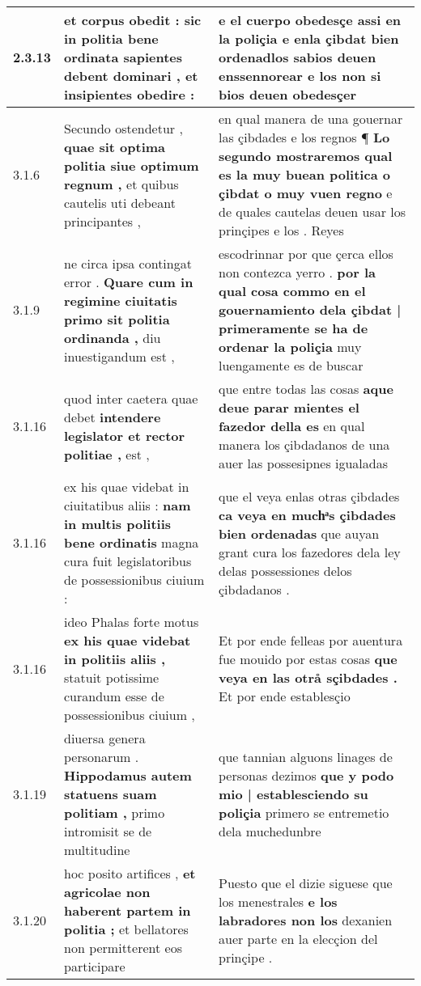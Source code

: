 \begin{tabular}{|p{1cm}|p{6.5cm}|p{6.5cm}|}
2.3.13 & et corpus obedit : \textbf{ sic in politia bene ordinata sapientes debent dominari , } et insipientes obedire : & e el cuerpo obedesçe assi en la poliçia \textbf{ e enla çibdat bien ordenadlos sabios deuen enssennorear } e los non si bios deuen obedesçer \\\hline
3.1.6 & Secundo ostendetur , \textbf{ quae sit optima politia siue optimum regnum , } et quibus cautelis uti debeant principantes , & en qual manera de una gouernar las çibdades e los regnos ¶ \textbf{ Lo segundo mostraremos qual es la muy buean politica o çibdat o muy vuen regno } e de quales cautelas deuen usar los prinçipes e los . Reyes \\\hline
3.1.9 & ne circa ipsa contingat error . \textbf{ Quare cum in regimine ciuitatis primo sit politia ordinanda , } diu inuestigandum est , & escodrinnar por que çerca ellos non contezca yerro . \textbf{ por la qual cosa commo en el gouernamiento dela çibdat | primeramente se ha de ordenar la poliçia } muy luengamente es de buscar \\\hline
3.1.16 & quod inter caetera quae debet \textbf{ intendere legislator et rector politiae , } est , & que entre todas las cosas \textbf{ aque deue parar mientes el fazedor della es } en qual manera los çibdadanos de una auer las possesipnes igualadas \\\hline
3.1.16 & ex his quae videbat in ciuitatibus aliis : \textbf{ nam in multis politiis bene ordinatis } magna cura fuit legislatoribus de possessionibus ciuium : & que el veya enlas otras çibdades \textbf{ ca veya en muchͣs çibdades bien ordenadas } que auyan grant cura los fazedores dela ley delas possessiones delos çibdadanos . \\\hline
3.1.16 & ideo Phalas forte motus \textbf{ ex his quae videbat in politiis aliis , } statuit potissime curandum esse de possessionibus ciuium , & Et por ende felleas por auentura fue mouido por estas cosas \textbf{ que veya en las otrå sçibdades . } Et por ende establesçio \\\hline
3.1.19 & diuersa genera personarum . \textbf{ Hippodamus autem statuens suam politiam , } primo intromisit se de multitudine & que tannian alguons linages de personas dezimos \textbf{ que y podo mio | establesciendo su poliçia } primero se entremetio dela muchedunbre \\\hline
3.1.20 & hoc posito artifices , \textbf{ et agricolae non haberent partem in politia ; } et bellatores non permitterent eos participare & Puesto que el dizie siguese que los menestrales \textbf{ e los labradores non los } dexanien auer parte en la elecçion del prinçipe . \\\hline

\end{tabular}

